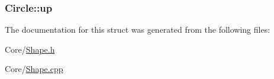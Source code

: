 \subsubsection[{\texorpdfstring{up}{up}}]{ Circle\+::up}\hypertarget{structCircle_a463e9f9c170f3047385ecab17ade6335}{}\label{structCircle_a463e9f9c170f3047385ecab17ade6335}


The documentation for this struct was generated from the following files\+:\begin{DoxyCompactItemize}
\item 
Core/\hyperlink{Shape_8h}{Shape.\+h}\item 
Core/\hyperlink{Shape_8cpp}{Shape.\+cpp}\end{DoxyCompactItemize}
